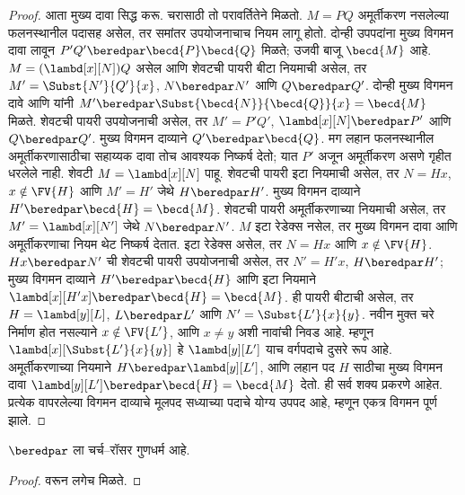 \documentclass[../../../include/open-logic-section]{subfiles}
\begin{document}
\begin{proof}
आता मुख्य दावा सिद्ध करू. चरासाठी तो परावर्तितेने मिळतो.
$M=PQ$ अमूर्तीकरण नसलेल्या फलनस्थानील पदासह असेल,
तर समांतर उपयोजनाचाच नियम लागू होतो. दोन्ही उपपदांना
मुख्य विगमन दावा लावून $P'Q'\beredpar\becd{P}\becd{Q}$
मिळते; उजवी बाजू $\becd{M}$ आहे.
$M=(\lambd[x][N])Q$ असेल आणि शेवटची पायरी बीटा
नियमाची असेल, तर $M'=\Subst{N'}{Q'}{x}$,
$N\beredpar N'$ आणि $Q\beredpar Q'$.
दोन्ही मुख्य विगमन दावे आणि  यांनी
$M'\beredpar\Subst{\becd{N}}{\becd{Q}}{x}=\becd{M}$
मिळते. शेवटची पायरी उपयोजनाची असेल, तर
$M'=P'Q'$, $\lambd[x][N]\beredpar P'$ आणि
$Q\beredpar Q'$. मुख्य विगमन दाव्याने
$Q'\beredpar\becd{Q}$. मग लहान फलनस्थानील
अमूर्तीकरणासाठीचा सहाय्यक दावा तोच आवश्यक निष्कर्ष देतो;
यात $P'$ अजून अमूर्तीकरण असणे गृहीत धरलेले नाही.
शेवटी $M=\lambd[x][N]$ पाहू. शेवटची पायरी इटा
नियमाची असेल, तर $N=Hx$, $x\notin\FV{H}$ आणि
$M'=H'$ जेथे $H\beredpar H'$. मुख्य विगमन दाव्याने
$H'\beredpar\becd{H}=\becd{M}$.
शेवटची पायरी अमूर्तीकरणाच्या नियमाची असेल, तर
$M'=\lambd[x][N']$ जेथे $N\beredpar N'$.
$M$ इटा रेडेक्स नसेल, तर मुख्य विगमन दावा आणि
अमूर्तीकरणाचा नियम थेट निष्कर्ष देतात.
इटा रेडेक्स असेल, तर $N=Hx$ आणि $x\notin\FV{H}$.
$Hx\beredpar N'$ ची शेवटची पायरी उपयोजनाची असेल,
तर $N'=H'x$, $H\beredpar H'$; मुख्य विगमन दाव्याने
$H'\beredpar\becd{H}$ आणि इटा नियमाने
$\lambd[x][H'x]\beredpar\becd{H}=\becd{M}$.
ही पायरी बीटाची असेल, तर $H=\lambd[y][L]$,
$L\beredpar L'$ आणि $N'=\Subst{L'}{x}{y}$.
नवीन मुक्त चरे निर्माण होत नसल्याने $x\notin\FV{L'}$,
आणि $x\ne y$ अशी नावांची निवड आहे. म्हणून
$\lambd[x][\Subst{L'}{x}{y}]$ हे $\lambd[y][L']$
याच वर्गपदाचे दुसरे रूप आहे. अमूर्तीकरणाच्या नियमाने
$H\beredpar\lambd[y][L']$, आणि लहान पद $H$ साठीचा
मुख्य विगमन दावा
$\lambd[y][L']\beredpar\becd{H}=\becd{M}$ देतो.
ही सर्व शक्य प्रकरणे आहेत. प्रत्येक वापरलेल्या विगमन
दाव्याचे मूलपद सध्याच्या पदाचे योग्य उपपद आहे,
म्हणून एकत्र विगमन पूर्ण झाले.
\end{proof}

\begin{thm}
  $\beredpar$ ला चर्च–रॉसर गुणधर्म आहे.
\end{thm}

\begin{proof}
   वरून लगेच मिळते.
\end{proof}
\end{document}
